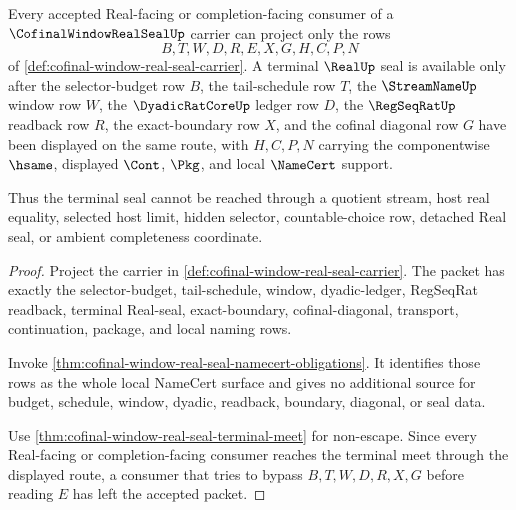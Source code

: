 \begin{theorem}
\label{thm:cofinal-window-real-seal-source-exhaustion}
Every accepted Real-facing or completion-facing consumer of a $\CofinalWindowRealSealUp$ carrier can project only the rows
$$
B,T,W,D,R,E,X,G,H,C,P,N
$$
of \autoref{def:cofinal-window-real-seal-carrier}. A terminal $\RealUp$ seal is available only after the selector-budget row $B$, the tail-schedule row $T$, the $\StreamNameUp$ window row $W$, the $\DyadicRatCoreUp$ ledger row $D$, the $\RegSeqRatUp$ readback row $R$, the exact-boundary row $X$, and the cofinal diagonal row $G$ have been displayed on the same route, with $H,C,P,N$ carrying the componentwise $\hsame$, displayed $\Cont$, $\Pkg$, and local $\NameCert$ support.

Thus the terminal seal cannot be reached through a quotient stream, host real equality, selected host limit, hidden selector, countable-choice row, detached Real seal, or ambient completeness coordinate.
\end{theorem}
\begin{proof}
Project the carrier in \autoref{def:cofinal-window-real-seal-carrier}. The packet has exactly the selector-budget, tail-schedule, window, dyadic-ledger, RegSeqRat readback, terminal Real-seal, exact-boundary, cofinal-diagonal, transport, continuation, package, and local naming rows.

Invoke \autoref{thm:cofinal-window-real-seal-namecert-obligations}. It identifies those rows as the whole local NameCert surface and gives no additional source for budget, schedule, window, dyadic, readback, boundary, diagonal, or seal data.

Use \autoref{thm:cofinal-window-real-seal-terminal-meet} for non-escape. Since every Real-facing or completion-facing consumer reaches the terminal meet through the displayed route, a consumer that tries to bypass $B,T,W,D,R,X,G$ before reading $E$ has left the accepted packet.
\end{proof}


